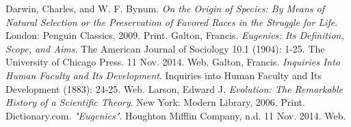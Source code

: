 \documentclass[11pt, oneside]{article}
\begin{document}
\begin{thebibliography}{9}
  Darwin, Charles, and W. F. Bynum.
  \emph{On the Origin of Species: By Means of Natural Selection or the Preservation of Favored Races in the Struggle for Life}.
  London: Penguin Classics, 2009.
  Print.
  Galton, Francis.
  \emph{Eugenics: Its Definition, Scope, and Aims}.
  The American Journal of Sociology 10.1 (1904): 1-25.
  The University of Chicago Press. 11 Nov. 2014.
  Web.
  Galton, Francis.
  \emph{Inquiries Into Human Faculty and Its Development}.
  Inquiries into Human Faculty and Its Development (1883): 24-25. 
  Web.
  Larson, Edward J.
  \emph{Evolution: The Remarkable History of a Scientific Theory}.
  New York: Modern Library, 2006. 
  Print.
  Dictionary.com.
  \emph{"Eugenics"}.
  Houghton Mifflin Company, n.d. 11 Nov. 2014.  
  Web.
\end{thebibliography}
\end{document}

